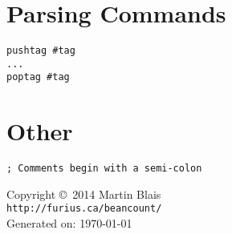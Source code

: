 \documentclass[10pt,landscape]{article}
\begin{document}
\begin{multicols}{2}
\section{Parsing Commands}
\begin{verbatim}
pushtag #tag
...
poptag #tag
\end{verbatim}



\section{Other}
\begin{verbatim}
; Comments begin with a semi-colon
\end{verbatim}



\scriptsize
\begin{center}
  Copyright \copyright\ 2014 Martin Blais \\
  \texttt{http://furius.ca/beancount/} \\
  Generated on: \today
\end{center}
\end{multicols}
\end{document}
